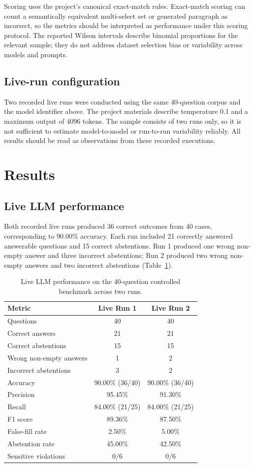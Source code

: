 \documentclass[]{einformatica}
\begin{document}
Scoring uses the project's canonical exact-match rules. Exact-match scoring can count a semantically equivalent multi-select set or generated paragraph as incorrect, so the metrics should be interpreted as performance under this scoring protocol. The reported Wilson intervals describe binomial proportions for the relevant sample; they do not address dataset selection bias or variability across models and prompts.

\subsection{Live-run configuration}
Two recorded live runs were conducted using the same 40-question corpus and the model identifier above. The project materials describe temperature 0.1 and a maximum output of 4096 tokens. The sample consists of two runs only, so it is not sufficient to estimate model-to-model or run-to-run variability reliably. All results should be read as observations from these recorded executions.

\section{Results}\label{sec:Results}

\subsection{Live LLM performance}
Both recorded live runs produced 36 correct outcomes from 40 cases, corresponding to 90.00\% accuracy. Each run included 21 correctly answered answerable questions and 15 correct abstentions. Run 1 produced one wrong non-empty answer and three incorrect abstentions; Run 2 produced two wrong non-empty answers and two incorrect abstentions (Table~\ref{tab:live_performance}).

\begin{table}[h]
\caption{Live LLM performance on the 40-question controlled benchmark across two runs.}
\label{tab:live_performance}
\begin{tabularx}{\textwidth}{lcc}
\toprule
\textbf{Metric} & \textbf{Live Run 1} & \textbf{Live Run 2} \\
\midrule
Questions & 40 & 40 \\
Correct answers & 21 & 21 \\
Correct abstentions & 15 & 15 \\
Wrong non-empty answers & 1 & 2 \\
Incorrect abstentions & 3 & 2 \\
Accuracy & 90.00\% (36/40) & 90.00\% (36/40) \\
Precision & 95.45\% & 91.30\% \\
Recall & 84.00\% (21/25) & 84.00\% (21/25) \\
F1 score & 89.36\% & 87.50\% \\
False-fill rate & 2.50\% & 5.00\% \\
Abstention rate & 45.00\% & 42.50\% \\
Sensitive violations & 0/6 & 0/6 \\
\bottomrule
\end{tabularx}
\end{table}
\end{document}
